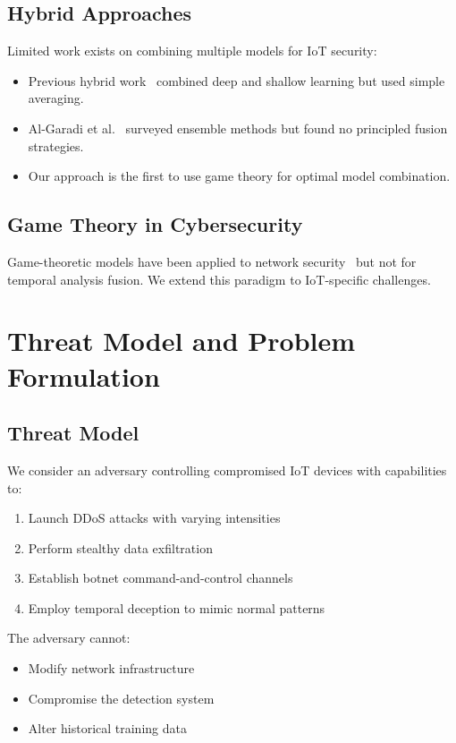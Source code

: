 \documentclass[10pt,conference]{IEEEtran}
\begin{document}
\subsection{Hybrid Approaches}

Limited work exists on combining multiple models for IoT security:
\begin{itemize}
    \item Previous hybrid work~\cite{cnn_lstm} combined deep and shallow learning but used simple averaging.
    \item Al-Garadi et al.~\cite{cnn_svm} surveyed ensemble methods but found no principled fusion strategies.
    \item Our approach is the first to use game theory for optimal model combination.
\end{itemize}

\subsection{Game Theory in Cybersecurity}

Game-theoretic models have been applied to network security~\cite{ids_game} but not for temporal analysis fusion. We extend this paradigm to IoT-specific challenges.

\section{Threat Model and Problem Formulation}

\subsection{Threat Model}

We consider an adversary controlling compromised IoT devices with capabilities to:
\begin{enumerate}
    \item Launch DDoS attacks with varying intensities
    \item Perform stealthy data exfiltration
    \item Establish botnet command-and-control channels
    \item Employ temporal deception to mimic normal patterns
\end{enumerate}

The adversary cannot:
\begin{itemize}
    \item Modify network infrastructure
    \item Compromise the detection system
    \item Alter historical training data
\end{itemize}
\end{document}
